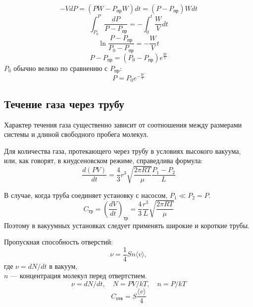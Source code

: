 \documentclass[a4paper,12pt]{article} %
\begin{document}
\begin{equation}
  -VdP = (P W - P_{\text{пр}} W)dt  = (P - P_{\text{пр}}) Wdt 
\end{equation}
\begin{equation}
  \int^{P}_{P_0}\frac{dP}{P - P_{\text{пр}}} = - \int^{t}_{0} \frac{W}{V} dt
\end{equation}
\begin{equation}
  \ln\frac{P - P_{\text{пр}}}{P_0 - P_{\text{пр}}} = - \frac{W}{V} t
\end{equation}
\begin{equation}
  P - P_{\text{пр}} = (P_0 - P_{\text{пр}}) e^{\frac{W}{V}}
\end{equation}
$P_0$ обычно велико по сравнению с $P_{\text{пр}}$:
\begin{equation}
  P = P_0 e^{- \frac{W}{V}}
\end{equation}

\subsection*{Течение газа через трубу}

Характер течения газа существенно зависит от соотношения между размерами системы и длиной свободного пробега молекул.

Для количества газа, протекающего через трубу в условиях высокого вакуума, или, как говорят, в кнудсеновском режиме, справедлива формула:
\begin{equation}
  \frac{d(PV)}{dt} = \frac{4}{3} r^3 \sqrt{\frac{2 \pi R T}{\mu}} \frac{P_1 - P_2}{L}
\end{equation}

В случае, когда труба соединяет установку с насосом, $P_1 \ll P_2 = P$.
\begin{equation}
  C_{\text{тр}} = \left( \frac{dV}{dt} \right)_{\text{тр}} = \frac{4}{3} \frac{r^3}{L} \sqrt{\frac{2 \pi R T}{\mu}} 
\end{equation}
Поэтому в вакуумных установках следует применять широкие и короткие трубы.

Пропускная способность отверстий:
\begin{equation}
  \nu = \frac{1}{4} Sn \langle v \rangle,
\end{equation}
где $\nu = dN/dt$ в вакуум, \\
$n$ — концентрация молекул перед отвертстием.\\
\begin{equation}
  \nu = dN/dt, \quad N = PV/kT, \quad n = P/kT
\end{equation}
\begin{equation}
  C_{\text{отв}} = S \frac{\langle v \rangle}{4}
\end{equation}
\end{document}
